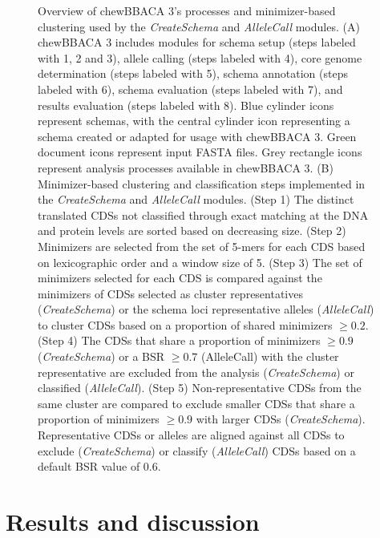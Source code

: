 \begin{figure}[!ht]
    \caption[Overview of chewBBACA 3’s processes and minimizer-based clustering used by the \textit{CreateSchema} and \textit{AlleleCall} modules.]{Overview of chewBBACA 3’s processes and minimizer-based clustering used by the \textit{CreateSchema} and \textit{AlleleCall} modules. (A) chewBBACA 3 includes modules for schema setup (steps labeled with 1, 2 and 3), allele calling (steps labeled with 4), core genome determination (steps labeled with 5), schema annotation (steps labeled with 6), schema evaluation (steps labeled with 7), and results evaluation (steps labeled with 8). Blue cylinder icons represent schemas, with the central cylinder icon representing a schema created or adapted for usage with chewBBACA 3. Green document icons represent input FASTA files. Grey rectangle icons represent analysis processes available in chewBBACA 3. (B) Minimizer-based clustering and classification steps implemented in the \textit{CreateSchema} and \textit{AlleleCall} modules. (Step 1) The distinct translated \acp{CDS} not classified through exact matching at the \ac{DNA} and protein levels are sorted based on decreasing size. (Step 2) Minimizers are selected from the set of 5-mers for each \ac{CDS} based on lexicographic order and a window size of 5. (Step 3) The set of minimizers selected for each \ac{CDS} is compared against the minimizers of \acp{CDS} selected as cluster representatives (\textit{CreateSchema}) or the schema loci representative alleles (\textit{AlleleCall}) to cluster \acp{CDS} based on a proportion of shared minimizers $\geq0.2$. (Step 4) The \acp{CDS} that share a proportion of minimizers $\geq0.9$ (\textit{CreateSchema}) or a \ac{BSR} $\geq0.7$ (AlleleCall) with the cluster representative are excluded from the analysis (\textit{CreateSchema}) or classified (\textit{AlleleCall}). (Step 5) Non-representative \acp{CDS} from the same cluster are compared to exclude smaller \acp{CDS} that share a proportion of minimizers $\geq0.9$ with larger \acp{CDS} (\textit{CreateSchema}). Representative \acp{CDS} or alleles are aligned against all \acp{CDS} to exclude (\textit{CreateSchema}) or classify (\textit{AlleleCall}) \acp{CDS} based on a default \ac{BSR} value of 0.6.}\label{fig:chap2_figure1_legend}
\end{figure}

\section{Results and discussion} \label{sec:ch2_results_and_discussion}

